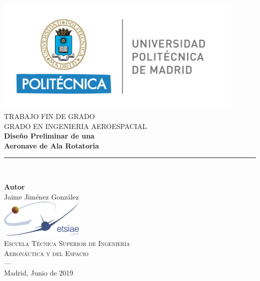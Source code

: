 \begin{titlepage}
\newlength{\centeroffset}
\setlength{\centeroffset}{-0.5\oddsidemargin}
\addtolength{\centeroffset}{0.5\evensidemargin}
\thispagestyle{empty}

\noindent\hspace*{\centeroffset}\begin{minipage}{\textwidth}

\centering
\includegraphics[width=0.9\textwidth]{imagenes/logo_UPM.png}\\[1.4cm]

\textsc{ \Large TRABAJO FIN DE GRADO\\[0.2cm]}
\textsc{ GRADO EN INGENIERIA AEROESPACIAL}\\[1cm]

{\Huge\bfseries Diseño Preliminar de una \\[0.2cm]
Aeronave de Ala Rotatoria}
\noindent\rule[-1ex]{\textwidth}{3pt}\\[3.5ex]
\end{minipage}

\vspace{2.5cm}
\noindent\hspace*{\centeroffset}
\begin{minipage}{\textwidth}
\centering

\textbf{Autor}\\ {Jaime Jiménez González}\\[0.5cm]
\includegraphics[width=0.3\textwidth]{imagenes/logo_ETSIAE.jpg}\\[0.1cm]
\textsc{Escuela Técnica Superior de Ingeniería \\
	Aeronáutica y del Espacio}\\
\textsc{---}\\
Madrid, Junio de 2019
\end{minipage}
\end{titlepage}
